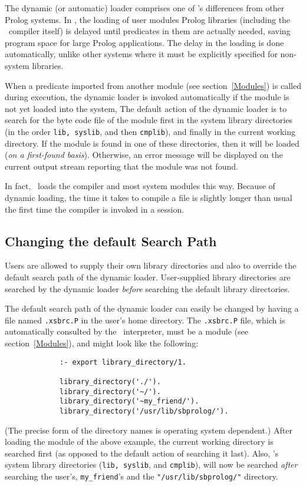 The dynamic (or automatic) loader comprises one of \ourprolog's 
differences from other Prolog systems.
In \ourprolog, the loading of user modules Prolog libraries (including
the \ourprolog\ compiler itself) is delayed until predicates in them
are actually needed, saving program space for large Prolog
applications.  The delay in the loading is done automatically, unlike
other systems where it must be explicitly specified for non-system
libraries.

When a predicate imported from another module (see section~\ref{Modules})
is called during execution, the dynamic loader is invoked automatically
if the module is not yet loaded into the system, 
The default action of the dynamic loader is to search for the
byte code file of the module 
first in the system library directories (in the order {\tt lib, syslib}, 
and then {\tt cmplib}), and finally in the current working directory.
If the module is found in one of these directories, then it will 
be loaded ({\em on a first-found basis}). Otherwise, an error 
message will be displayed on the current output stream
reporting that the module was not found.

In fact, \ourprolog\ loads the compiler and most system modules this way.
Because of dynamic loading, the time it takes to compile a file 
is slightly longer than usual the first time the compiler is 
invoked in a session.


\subsection{Changing the default Search Path}
Users are allowed to supply their own library directories and also to
override the default search path of the dynamic loader. 
User-supplied library directories are searched by the dynamic loader 
{\em before} searching the default library directories.

The default search path of the dynamic loader can easily be changed
by having a file named {\verb|.xsbrc.P|} in the user's home directory.  
The {\verb|.xsbrc.P|} file, which is automatically consulted by the
 \ourprolog\ interpreter, must be a module (see section~\ref{Modules}),
and might look like the following:
\begin{verbatim}
             :- export library_directory/1.

             library_directory('./').
             library_directory('~/').
             library_directory('~my_friend/').
             library_directory('/usr/lib/sbprolog/').
\end{verbatim}
(The precise form of the directory names is operating system dependent.)
After loading the module of the above 
example, the current working directory is searched first (as opposed to the
default action of searching it last).  Also, \ourprolog's system
library directories ({\tt lib, syslib}, and {\tt cmplib}), will now
be searched {\em after} searching the user's, {\tt my\_friend}'s 
and the {\tt "/usr/lib/sbprolog/"} directory.

